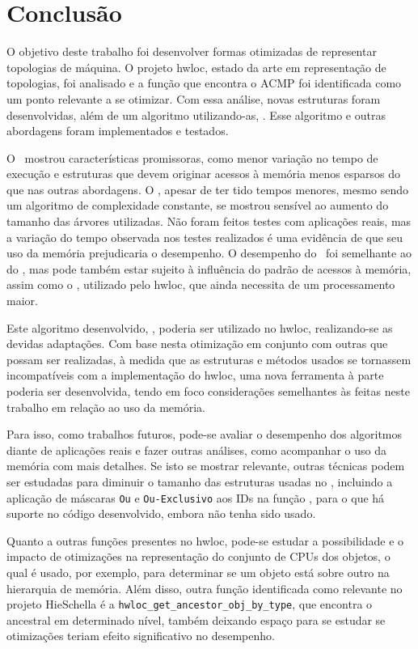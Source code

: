 \chapter{Conclusão}
\label{cap:conclusao}


O objetivo deste trabalho foi desenvolver formas otimizadas de representar topologias de máquina.
O projeto hwloc, estado da arte em representação de topologias, foi analisado e a função que encontra o ACMP foi identificada como um ponto relevante a se otimizar.
Com essa análise,
novas estruturas foram desenvolvidas, além de um algoritmo utilizando-as, \Novo.
Esse algoritmo e outras abordagens foram implementados e testados.

O \Novo\ mostrou características promissoras, como menor variação no tempo de execução e estruturas que devem originar acessos à memória menos esparsos do que nas outras abordagens.
O \Matriz, apesar de ter tido tempos menores, mesmo sendo um algoritmo de complexidade constante, se mostrou sensível ao aumento do tamanho das árvores utilizadas.
Não foram feitos testes com aplicações reais, mas a variação do tempo observada nos testes realizados é uma evidência de que seu uso da memória prejudicaria o desempenho.
O desempenho do \Simples\ foi semelhante ao do \Novo, mas pode também estar sujeito à influência do padrão de acessos à memória, assim como o \Hwloc, utilizado pelo hwloc, que ainda necessita de um processamento maior.

Este algoritmo desenvolvido, \Novo, poderia ser utilizado no hwloc, realizando-se as devidas adaptações.
Com base nesta otimização em conjunto com outras que possam ser realizadas, à medida que as estruturas e métodos usados se tornassem incompatíveis com a implementação do hwloc, uma nova ferramenta à parte poderia ser desenvolvida, tendo em foco considerações semelhantes às feitas neste trabalho em relação ao uso da memória.


Para isso, como trabalhos futuros,
pode-se avaliar o desempenho dos algoritmos diante de aplicações reais
e fazer outras análises, como acompanhar o uso da memória com mais detalhes.
Se isto se mostrar relevante,
outras técnicas podem ser estudadas para diminuir o tamanho das estruturas usadas no \Novo,
incluindo a aplicação de máscaras \texttt{Ou} e \texttt{Ou-Exclusivo} aos IDs na função \Espalha,
para o que há suporte no código desenvolvido, embora não tenha sido usado.

Quanto a outras funções presentes no hwloc, pode-se estudar a possibilidade e o impacto de otimizações na representação do conjunto de CPUs dos objetos, o qual é usado, por exemplo, para determinar se um objeto está sobre outro na hierarquia de memória.
Além disso, outra função identificada como relevante no projeto HieSchella é a \mbox{\texttt{hwloc\_get\_ancestor\_obj\_by\_type}}, que encontra o ancestral em determinado nível, também deixando espaço para se estudar se otimizações teriam efeito significativo no desempenho.


